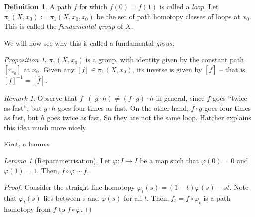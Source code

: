 \documentclass[a4paper]{report}
\theoremstyle{definition}
\newtheorem{definition}{Definition}
\theoremstyle{remark}
\newtheorem{remark}{Remark}
\theoremstyle{proposition}
\newtheorem{proposition}{Proposition}
\theoremstyle{conjecture}
\theoremstyle{lemma}
\newtheorem{lemma}{Lemma}
\theoremstyle{corollary}
\theoremstyle{exercise}
\begin{document}
\begin{definition}
    A path $f$ for which $f(0) = f(1)$ is called a \emph{loop}. 
    Let $\pi_1(X,x_0) := \pi_1(X,x_0,x_0)$ be the set of path homotopy
    classes of loops at $x_0$. This is called the \emph{fundamental group} of 
    $X$.
\end{definition}

We will now see why this is called a fundamental \emph{group}:

\begin{proposition}\label{prop_fund_group}
    $\pi_1(X,x_0)$ is a group, with identity given by the constant path 
    $[c_{x_0}]$ at $x_0$. Given any $[f] \in \pi_1(X,x_0)$, its inverse
    is given by $[\overline{f}]$ -- that is, $[f]^{-1} = [\overline{f}]$.
\end{proposition}

\begin{remark}
    Observe that $f \cdot (\cdot g \cdot h) \neq (f\cdot g)\cdot h$ in general, 
    since $f$ goes ``twice as fast'', but $g\cdot h$ goes four times 
    as fast. On the other hand, $f\cdot g$ goes four times as fast,
    but $h$ goes twice as fast. So they are not the same loop.
    Hatcher explains this idea much more nicely.
\end{remark}

First, a lemma:

\begin{lemma}[Reparametrisation]
    Let $\varphi : I \to I$ be a map such that 
    $\varphi(0) = 0$ and $\varphi(1) = 1$.
    Then, $f\circ \varphi \sim f$.
\end{lemma}

\begin{proof}
    Consider the straight line homotopy $\varphi_t(s) = (1-t) \varphi(s) - st$.
    Note that $\varphi_t(s)$ lies between $s$ and $\varphi(s)$ for all $t$.
    Then, $f_t = f \circ \varphi_t$ is a path homotopy from $f$ to 
    $f\circ \varphi$.
\end{proof}
\end{document}
